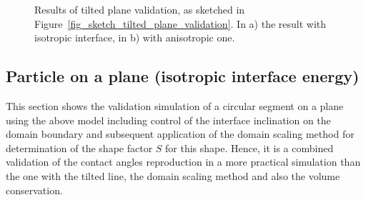 	\begin{figure}
		\centering
		\caption[Results of tilted plane validation]{Results of tilted plane validation, as sketched in Figure~\ref{fig_sketch_tilted_plane_validation}. In a) the result with isotropic interface, in b) with anisotropic one. }
		\label{fig_tilted_plane_validation_results}
	\end{figure}
	
	\subsection{Particle on a plane (isotropic interface energy)}
	This section shows the validation simulation of a circular segment on a plane using the above model including control of the interface inclination on the domain boundary and subsequent application of the domain scaling method for determination of the shape factor $S$ for this shape. Hence, it is a combined validation of the contact angles reproduction in a more practical simulation than the one with the tilted line, the domain scaling method and also the volume conservation.
	
